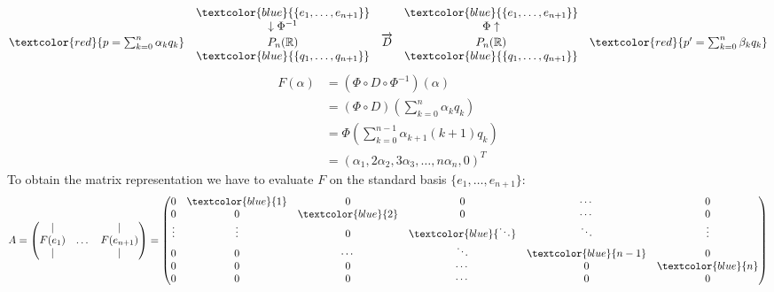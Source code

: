 {\begin{enumerate}
$$\begin{matrix}
	&\textcolor{blue}{\{e_1,\dots,e_{n+1}\}}& &\textcolor{blue}{\{e_1,\dots,e_{n+1}\}}& \\
	&\downarrow \Phi^{-1}& &\Phi\uparrow& \\
	\textcolor{red}{p=\sum_{k=0}^{n}\alpha_kq_k}&P_n(\mathbb{R})&\overrightarrow{D}&P_n(\mathbb{R})&\textcolor{red}{p'=\sum_{k=0}^{n}\beta_kq_k}\\
	&\textcolor{blue}{\{q_1,\dots,q_{n+1}\}}& &\textcolor{blue}{\{q_1,\dots,q_{n+1}\}}& 
	\end{matrix}
	$$
	\begin{align*}
	F(\alpha)&=(\Phi\circ D\circ\Phi^{-1})(\alpha)\\
	&=(\Phi\circ D)\left(\sum_{k=0}^{n}\alpha_kq_k\right)\\
	&=\Phi\left(\sum_{k=0}^{n-1}\alpha_{k+1}(k+1)q_k\right)\\
	&=(\alpha_1,2\alpha_2,3\alpha_3,\dots,n\alpha_n,0)^T
	\end{align*}
	To obtain the matrix representation we have to evaluate $F$ on the standard basis $\{e_1,\dots,e_{n+1}\}$:
	$$
	A=\begin{pmatrix}
	|& &|\\
	F(e_1)&\dots&F(e_{n+1})\\
	|& &|
	\end{pmatrix}
	=\begin{pmatrix}
	0&\textcolor{blue}{1}&0&0&\cdots&0\\
	0&0&\textcolor{blue}{2}&0&\cdots&0\\
	\vdots&\vdots&0&\textcolor{blue}{\ddots}&\ddots&\vdots\\
	0&0&\cdots&\ddots&\textcolor{blue}{n-1}&0\\
	0&0&0&\cdots&0&\textcolor{blue}{n}\\
	0&0&0&\cdots&0&0
	\end{pmatrix}
	$$
\end{enumerate}
}